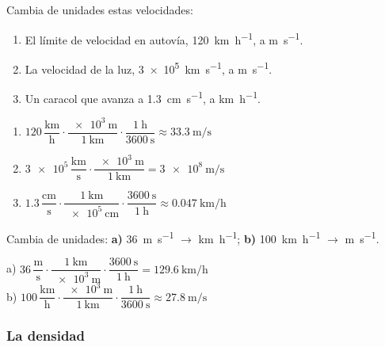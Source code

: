 \begin{exercise}
    Cambia de unidades estas velocidades:
    \begin{enumerate}[label=\letraminuscula]
        \item El límite de velocidad en autovía, \qty{120}{\km\per\hour}, a \unit{\m\per\s}.
        \item La velocidad de la luz, \qty{3e5}{\km\per\s}, a \unit{\m\per\s}.
        \item Un caracol que avanza a \qty{1.3}{\cm\per\s}, a \unit{\km\per\hour}.
    \end{enumerate}
    \begin{solu}
        \begin{enumerate}[label=\alph*)]
            \item \(\num{120}\,\dfrac{\unit{\km}}{\unit{\hour}} \cdot \dfrac{\qty{e3}{\m}}{\qty{1}{\km}} \cdot \dfrac{\qty{1}{\hour}}{\qty{3600}{\s}} \approx \qty{33.3}{\m\per\s}\)
            \item \(\num{3e5}\,\dfrac{\unit{\km}}{\unit{\s}} \cdot \dfrac{\qty{e3}{\m}}{\qty{1}{\km}} = \qty{3e8}{\m\per\s}\)
            \item \(\num{1.3}\,\dfrac{\unit{\cm}}{\unit{\s}} \cdot \dfrac{\qty{1}{\km}}{\qty{e5}{\cm}} \cdot \dfrac{\qty{3600}{\s}}{\qty{1}{\hour}} \approx \qty{0.047}{\km\per\hour}\)
        \end{enumerate}
    \end{solu}
\end{exercise}

\begin{exercise}
    Cambia de unidades: \textbf{a)} \qty{36}{\m\per\s} \(\to\) \unit{\km\per\hour}; \textbf{b)} \qty{100}{\km\per\hour} \(\to\) \unit{\m\per\s}.
    \begin{solu}
        a) \(\num{36}\,\dfrac{\unit{\m}}{\unit{\s}} \cdot \dfrac{\qty{1}{\km}}{\qty{e3}{\m}} \cdot \dfrac{\qty{3600}{\s}}{\qty{1}{\hour}} = \qty{129.6}{\km\per\hour}\) \\
        b) \(\num{100}\,\dfrac{\unit{\km}}{\unit{\hour}} \cdot \dfrac{\qty{e3}{\m}}{\qty{1}{\km}} \cdot \dfrac{\qty{1}{\hour}}{\qty{3600}{\s}} \approx \qty{27.8}{\m\per\s}\)
    \end{solu}
\end{exercise}


\subsubsection{La densidad}

